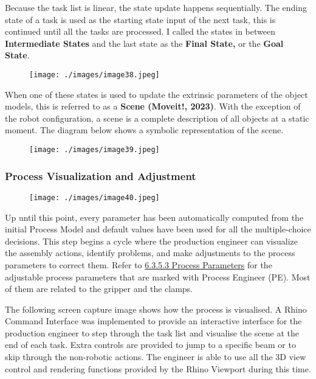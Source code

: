 Because the task list is linear, the state update happens sequentially. The ending state of a task is used as the starting state input of the next task, this is continued until all the tasks are processed. I called the states in between \textbf{Intermediate States }and the last state as the \textbf{Final State, }or the \textbf{Goal State}.

\begin{figure}[H]
\texttt{[image: ./images/image38.jpeg]}
\end{figure}


When one of these states is used to update the extrinsic parameters of the object models, this is referred to as a \textbf{Scene \href{https://www.zotero.org/google-docs/?5iCzjM}{}(Moveit!, 2023)}. With the exception of the robot configuration, a scene is a complete description of all objects at a static moment. The diagram below shows a symbolic representation of the scene.

\begin{figure}[H]
\texttt{[image: ./images/image39.jpeg]}
\end{figure}


\subsubsection{Process Visualization and Adjustment}

\begin{figure}[H]
\texttt{[image: ./images/image40.jpeg]}
\end{figure}


Up until this point, every parameter has been automatically computed from the initial Process Model and default values have been used for all the multiple-choice decisions. This step begins a cycle where the production engineer can visualize the assembly actions, identify problems, and make adjustments to the process parameters to correct them. Refer to \uline{6.3.5.3 Process Parameters} for the adjustable process parameters that are marked with Process Engineer (PE). Most of them are related to the gripper and the clamps. 


The following screen capture image shows how the process is visualised. A Rhino Command Interface was implemented to provide an interactive interface for the production engineer to step through the task list and visualise the scene at the end of each task. Extra controls are provided to jump to a specific beam or to skip through the non-robotic actions. The engineer is able to use all the 3D view control and rendering functions provided by the Rhino Viewport during this time.

